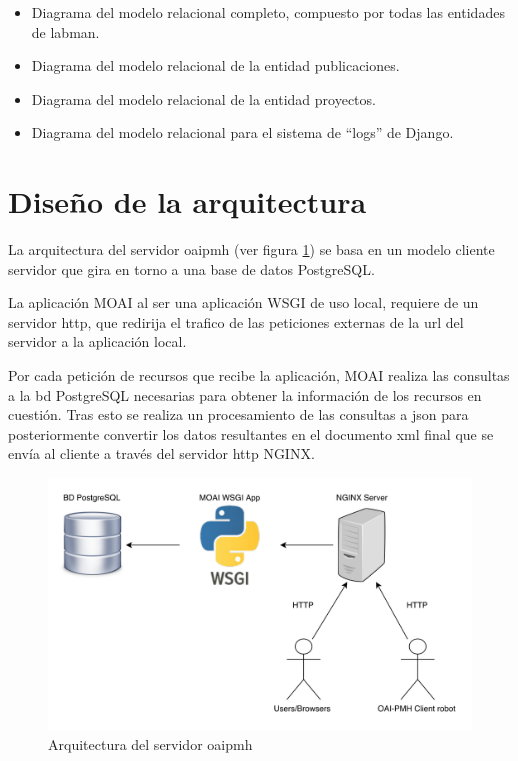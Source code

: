 \begin{itemize}
	\item Diagrama del modelo relacional completo, compuesto por todas las entidades de \acrshort{labman}.
	\item Diagrama del modelo relacional de la entidad publicaciones.
	\item Diagrama del modelo relacional de la entidad proyectos.
	\item Diagrama del modelo relacional para el sistema de ``logs'' de Django.
\end{itemize}

\section{Diseño de la arquitectura}

La arquitectura del servidor \acrshort{oaipmh} (ver figura \ref{fig:oai_architecture}) se basa en un modelo cliente servidor que gira en torno a una base de datos PostgreSQL.

La aplicación MOAI al ser una aplicación WSGI de uso local, requiere de un servidor \acrshort{http}, que redirija el trafico de las peticiones externas de la \acrshort{url} del servidor a la aplicación local.

Por cada petición de recursos que recibe la aplicación, MOAI realiza las consultas a la \acrshort{bd} PostgreSQL necesarias para obtener la información de los recursos en cuestión. Tras esto se realiza un procesamiento de las consultas a \acrfull{json}\cite{JSON} para posteriormente convertir los datos resultantes en el documento \acrshort{xml} final que se envía al cliente a través del servidor \acrshort{http} NGINX\cite{NGINX}.

\begin{figure}[!htbp]
	\centering
	\includegraphics[scale=0.5]{fig/architecture/oai_achitecture}
	\caption{Arquitectura del servidor \acrshort{oaipmh}}
	\label{fig:oai_architecture}
\end{figure}

